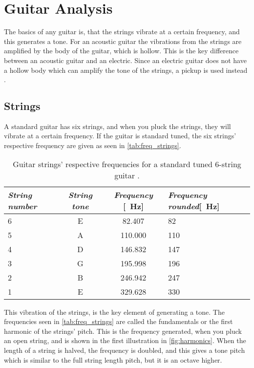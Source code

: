 \section{Guitar Analysis}\label{sec:guitar_analysis}
The basics of any guitar is, that the strings vibrate at a certain frequency, and this generates a tone. For an acoustic  guitar the vibrations from the strings are amplified by the body of the guitar, which is hollow. This is the key difference between an acoustic guitar and an electric. Since an electric guitar does not have a hollow body which can amplify the tone of the strings, a pickup is used instead \citep{elecguit}. 

\subsection{Strings}
A standard guitar has six strings, and when you pluck the strings, they will vibrate at a certain frequency. If the guitar is standard tuned, the six strings' respective frequency are given as seen in \autoref{tab:freq_strings}.

\begin{table}[httb!]
	\centering
	\caption{Guitar strings' respective frequencies for a standard tuned 6-string guitar \citep{harmonics}.}
	\label{tab:freq_strings}
	\begin{threeparttable}
		\begin{tabularx}{\textwidth}{X c c X}
			\textit{String number} & \textit{String tone}  & \textit{Frequency} [\SI{}{\hertz}] & \textit{Frequency rounded}[\SI{}{\hertz}]\\ \toprule \rowcolor{lightGrey}
			6 & E & 82.407 & 82\\
			5 & A & 110.000 & 110 \\ 
			\rowcolor{lightGrey}
			4 & D & 146.832 & 147 \\
			3 & G & 195.998 & 196 \\
				\rowcolor{lightGrey}
			2 & B & 246.942 & 247 \\ 
			1 & E & 329.628 & 330\\
		\end{tabularx}
	\end{threeparttable}
\end{table}

This vibration of the strings, is the key element of generating a tone. The frequencies seen in \autoref{tab:freq_strings} are called the fundamentals or the first harmonic of the strings' pitch. This is the frequency generated, when you pluck an open string, and is shown in the first illustration in \autoref{fig:harmonics}. When the length of a string is halved, the frequency is doubled, and this gives a tone pitch which is similar to the full string length pitch, but it is an octave higher.

